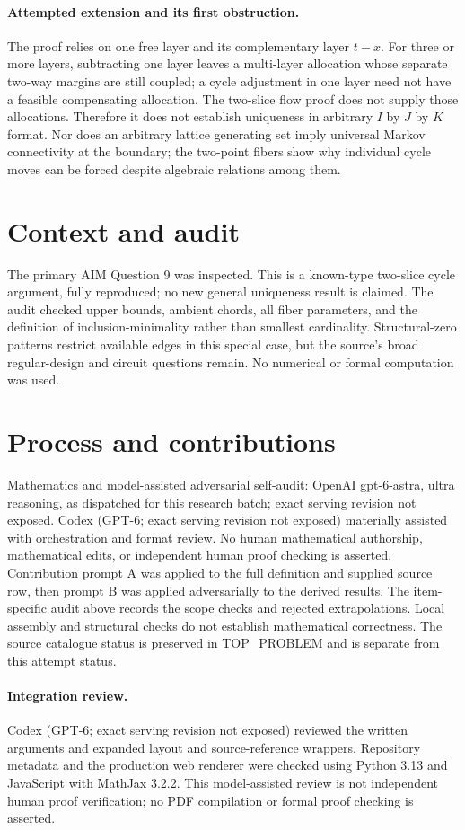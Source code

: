 \documentclass[11pt]{article}
\begin{document}
\paragraph{Attempted extension and its first obstruction.}
The proof relies on one free layer and its complementary layer $t-x$.
For three or more layers, subtracting one layer leaves a multi-layer
allocation whose separate two-way margins are still coupled; a cycle
adjustment in one layer need not have a feasible compensating allocation.
The two-slice flow proof does not supply those allocations. Therefore it
does not establish uniqueness in arbitrary $I$ by $J$ by $K$ format.
Nor does an arbitrary lattice generating set imply universal Markov
connectivity at the boundary; the two-point fibers show why individual
cycle moves can be forced despite algebraic relations among them.

\section{Context and audit}
The primary AIM Question 9 was inspected. This is a known-type two-slice
cycle argument, fully reproduced; no new general uniqueness result is
claimed. The audit checked upper bounds, ambient chords, all fiber
parameters, and the definition of inclusion-minimality rather than
smallest cardinality. Structural-zero patterns restrict available edges
in this special case, but the source's broad regular-design and circuit
questions remain. No numerical or formal computation was used.

\section{Process and contributions}
Mathematics and model-assisted adversarial self-audit: OpenAI gpt-6-astra, ultra reasoning, as dispatched for this research batch; exact serving revision not exposed. Codex (GPT-6; exact serving revision not exposed) materially assisted with orchestration and format review. No human mathematical authorship, mathematical edits, or independent human proof checking is asserted.
Contribution prompt A was applied to the full definition and supplied source row, then prompt B was applied adversarially to the derived results. The item-specific audit above records the scope checks and rejected extrapolations. Local assembly and structural checks do not establish mathematical correctness. The source catalogue status is preserved in TOP\_PROBLEM and is separate from this attempt status.
\paragraph{Integration review.} Codex (GPT-6; exact serving revision not exposed) reviewed the written arguments and expanded layout and source-reference wrappers. Repository metadata and the production web renderer were checked using Python 3.13 and JavaScript with MathJax 3.2.2. This model-assisted review is not independent human proof verification; no PDF compilation or formal proof checking is asserted.
\end{document}
